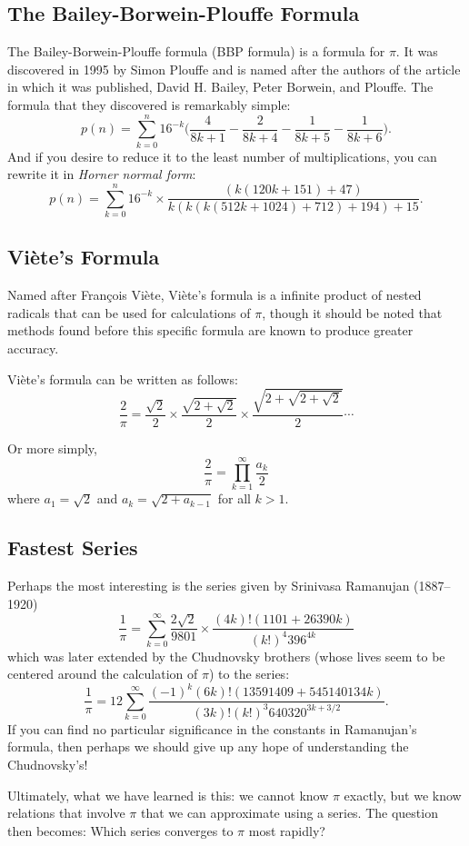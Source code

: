 \subsection{The Bailey-Borwein-Plouffe Formula}

The Bailey-Borwein-Plouffe formula (BBP formula) is a formula for $\pi$.
It was discovered in 1995 by Simon Plouffe and is named after the
authors of the article in which it was published, David H.\xspace
Bailey, Peter Borwein, and Plouffe. The formula that they discovered is
remarkably simple:
$$
p(n)=\sum _{k=0}^n {16^{-k}}\Biggl ( {\frac{4}{8 k+1}-\frac{2}{8
  k+4}-\frac{1}{8 k+5}-\frac{1}{8 k+6}} \Biggl ) .
$$
And if you desire to reduce it to the least number of multiplications,
you can rewrite it in \emph{Horner normal form}:
$$
p(n)=\sum _{k=0}^n {16^{-k}}\times \frac{ (k (120 k+151)+47)}{k (k (k
(512 k+1024)+712)+194)+15} .
$$

\subsection{Vi\`{e}te's Formula}

Named after Fran\c{c}ois Vi\`{e}te, Vi\`{e}te's formula is a infinite
product of nested radicals that can be used for calculations of $\pi$,
though it should be noted that methods found before this specific
formula are known to produce greater accuracy.

Vi\`{e}te's formula can be written as follows:
\[
  \frac{2}{\pi} = \frac{\sqrt{2}}{2} \times \frac{\sqrt{2 +
  \sqrt{2}}}{2} \times \frac{\sqrt{2 + \sqrt{2 + \sqrt{2}}}}{2} \cdots
\]

Or more simply,
\[
  \frac{2}{\pi} = \prod_{k=1}^{\infty} \frac{a_k}{2}
\]
where $a_1 = \sqrt{2}$ and $a_k = \sqrt{2 + a_{k-1}}$ for all $k > 1$.


\subsection{Fastest Series}

Perhaps the most interesting is the series given by Srinivasa Ramanujan
(1887--1920)
$$
\frac{1}{\pi}=
\sum_{k=0}^\infty
\frac{2 \sqrt{2}}{9801} \times
\frac{(4k)!  (1101 + 26390 k)}{(k!)^4 396^{4k}}
$$
which was later extended by the Chudnovsky brothers (whose lives seem to
be centered around the calculation of $\pi$) to the series:
$$
\frac{1}{\pi} = 12 \sum_{k=0}^\infty \frac{(-1)^k (6k)! (13591409 +
545140134 k)}{(3k)! (k!)^3 640320^{3k + 3/2}} .
$$
If you can find no particular significance in the constants in
Ramanujan's formula, then perhaps we should give up any hope of
understanding the Chudnovsky's!

Ultimately, what we have learned is this: we cannot know $\pi$ exactly,
but we know relations that involve $\pi$ that we can approximate using a
series. The question then becomes: Which series converges to $\pi$ most
rapidly?
